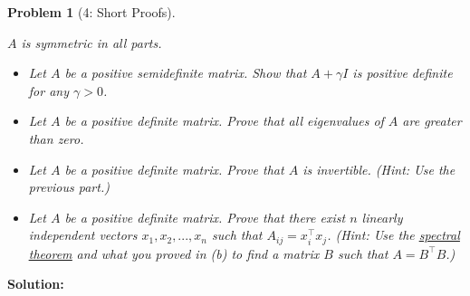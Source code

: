 \documentclass[11pt]{exam}
\theoremstyle{quest}
\newtheorem*{question}{Problem}
\begin{document}
\newpage


\begin{question}[4: Short Proofs]
~

$A$ is symmetric in all parts.
\begin{itemize}
\item[(a)]
Let $A$ be a positive semidefinite matrix. Show that $A + \gamma I$ is positive
definite for any $\gamma > 0$.
\item[(b)]
Let $A$ be a positive definite matrix. Prove that all eigenvalues of $A$ are greater than zero.
\item[(c)]
Let $A$ be a positive definite matrix. Prove that $A$ is invertible. (Hint: Use the previous part.)
\item[(d)]
Let $A$ be a positive definite matrix. Prove that there exist $n$ linearly independent vectors $x_{1}, x_{2}, ..., x_{n}$
such that $A_{ij} = x_{i}^{\top}x_{j}$. (Hint: Use the
\href{https://inst.eecs.berkeley.edu/~ee127a/book/login/l_sym_sed.html}{\underline{spectral
    theorem}} and what you proved in (b) to find a matrix $B$ such that $A = B^{\top}B$.)
\end{itemize}
\end{question}
\textbf{Solution:}
\end{document}
